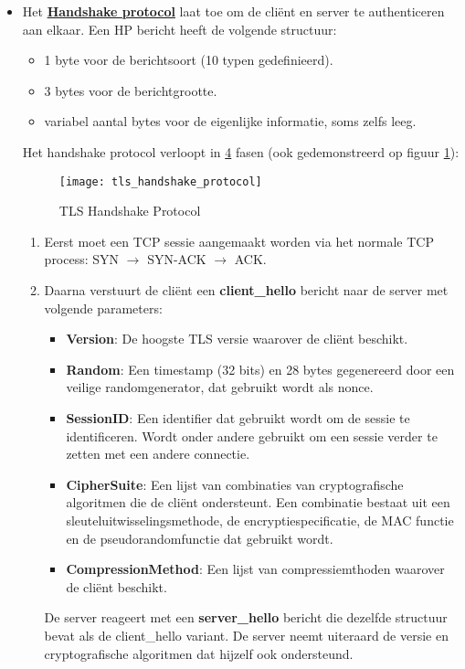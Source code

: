 \documentclass{report}
\begin{document}
\begin{itemize}
	\item Het \underline{\textbf{Handshake protocol}} laat toe om de cliënt en server te authenticeren aan elkaar. Een HP bericht heeft de volgende structuur:
	\begin{itemize}
		\item 1 byte voor de berichtsoort (10 typen gedefinieerd).
		\item 3 bytes voor de berichtgrootte.
		\item variabel aantal bytes voor de eigenlijke informatie, soms zelfs leeg.
	\end{itemize}
	
	Het handshake protocol verloopt in \underline{4} fasen (ook gedemonstreerd op figuur \ref{fig:tls_handshake_protocol}):
	\begin{figure}[ht]
		\texttt{[image: tls\_handshake\_protocol]}
		\caption{TLS Handshake Protocol}
		\label{fig:tls_handshake_protocol}
	\end{figure}
	\begin{enumerate}
		\item Eerst moet een TCP sessie aangemaakt worden via het normale TCP process: SYN $\rightarrow$ SYN-ACK $\rightarrow$ ACK.
		\item Daarna verstuurt de cliënt een \textbf{client\_hello} bericht naar de server met volgende parameters:
			\begin{itemize}
				\item \textbf{Version}: De hoogste TLS versie waarover de cliënt beschikt.
				\item \textbf{Random}: Een timestamp (32 bits) en 28 bytes gegenereerd door een veilige randomgenerator, dat gebruikt wordt als nonce.
				\item \textbf{SessionID}: Een identifier dat gebruikt wordt om de sessie te identificeren. Wordt onder andere gebruikt om een sessie verder te zetten met een andere connectie.
				\item \textbf{CipherSuite}: Een lijst van combinaties van cryptografische algoritmen die de cliënt ondersteunt. Een combinatie bestaat uit een sleuteluitwisselingsmethode, de encryptiespecificatie, de MAC functie en de pseudorandomfunctie dat gebruikt wordt.
				\item \textbf{CompressionMethod}: Een lijst van compressiemthoden waarover de cliënt beschikt.
			\end{itemize}
			De server reageert met een \textbf{server\_hello} bericht die dezelfde structuur bevat als de client\_hello variant. De server neemt uiteraard de versie en cryptografische algoritmen dat hijzelf ook ondersteund.

\end{enumerate}
\end{itemize}
\end{document}
